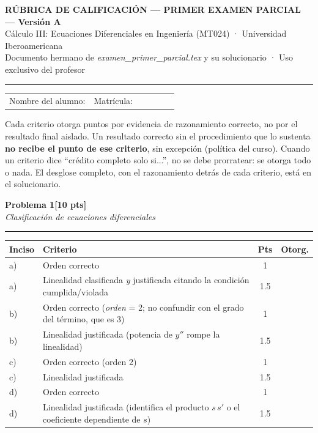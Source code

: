 \documentclass[11pt,letterpaper]{article}
\makeatletter
\newcommand{\problema}[3]{%
  \bigskip\bigskip\noindent
  {\Large\textbf{Problema #1}}\hfill\textbf{[#2 pts]}\\[3pt]
  {\small\itshape #3}\par
  \vspace{2pt}\hrule\vspace{8pt}
}
\newenvironment{tablarubrica}{%
  \begin{tabular}{@{}p{1.1cm}Lcc@{}}
  \toprule
  \textbf{Inciso} & \textbf{Criterio} & \textbf{Pts} & \textbf{Otorg.} \\
  \midrule
}{%
  \bottomrule
  \end{tabular}
}
\makeatother
\begin{document}
\begin{center}
{\Large\bfseries RÚBRICA DE CALIFICACIÓN — PRIMER EXAMEN PARCIAL --- Versión A}\\[2pt]
{\small Cálculo III: Ecuaciones Diferenciales en Ingeniería (MT024) · Universidad Iberoamericana}\\[1pt]
{\small Documento hermano de \textit{examen\_primer\_parcial.tex} y su solucionario · Uso exclusivo del profesor}
\end{center}

\vspace{4pt}\hrule\vspace{10pt}

\noindent
\begin{tabular}{@{}p{0.5\linewidth}p{0.5\linewidth}@{}}
Nombre del alumno: \dotfill & Matrícula: \dotfill \\[10pt]
\end{tabular}

\vspace{10pt}

 Cada criterio otorga puntos por evidencia de razonamiento correcto, no por el resultado final aislado. Un resultado correcto sin el procedimiento que lo sustenta \textbf{no recibe el punto de ese criterio}, sin excepción (política del curso). Cuando un criterio dice ``crédito completo solo si...'', no se debe prorratear: se otorga todo o nada. El desglose completo, con el razonamiento detrás de cada criterio, está en el solucionario.

\problema{1}{10}{Clasificación de ecuaciones diferenciales}

\begin{tablarubrica}
a) & Orden correcto & 1 & \\
a) & Linealidad clasificada \emph{y} justificada citando la condición cumplida/violada & 1.5 & \\
b) & Orden correcto (\emph{orden} = 2; no confundir con el grado del término, que es 3) & 1 & \\
b) & Linealidad justificada (potencia de $y''$ rompe la linealidad) & 1.5 & \\
c) & Orden correcto (orden 2) & 1 & \\
c) & Linealidad justificada & 1.5 & \\
d) & Orden correcto & 1 & \\
d) & Linealidad justificada (identifica el producto $s\,s'$ o el coeficiente dependiente de $s$) & 1.5 & \\
\end{tablarubrica}
\end{document}

